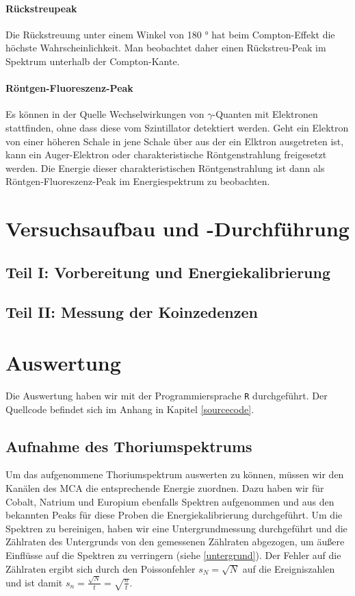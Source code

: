 \documentclass[12pt,listof=totoc]{scrartcl}
\newcommand{\code}[1]{\texttt{#1}}
\begin{document}
 \paragraph{Rückstreupeak}
 
 Die Rückstreuung unter einem Winkel von 180 ° hat beim Compton-Effekt die höchste Wahrscheinlichkeit.
 Man beobachtet daher einen Rückstreu-Peak im Spektrum unterhalb der Compton-Kante.

 
 \paragraph{Röntgen-Fluoreszenz-Peak}
Es können in der Quelle Wechselwirkungen von $\gamma$-Quanten mit Elektronen stattfinden, ohne dass diese vom Szintillator detektiert werden. Geht ein Elektron von einer höheren Schale in jene Schale über aus der ein Elktron ausgetreten ist, kann ein Auger-Elektron oder charakteristische Röntgenstrahlung freigesetzt werden. Die Energie dieser charakteristischen Röntgenstrahlung ist dann als Röntgen-Fluoreszenz-Peak im Energiespektrum zu beobachten.




\newpage
\section{Versuchsaufbau und -Durchführung}

\subsection{Teil I: Vorbereitung und Energiekalibrierung}

\subsection{Teil II: Messung der Koinzedenzen}




\newpage
\section{Auswertung}Die Auswertung haben wir mit der Programmiersprache \code{R} durchgeführt. Der Quellcode befindet sich im Anhang in Kapitel \ref{sourcecode}.
\subsection{Aufnahme des Thoriumspektrums}
Um das aufgenommene Thoriumspektrum auswerten zu können, müssen wir den Kanälen des MCA die entsprechende Energie zuordnen. Dazu haben wir für Cobalt, Natrium und Europium ebenfalls Spektren aufgenommen und aus den bekannten Peaks für diese Proben die Energiekalibrierung durchgeführt. Um die Spektren zu bereinigen, haben wir eine Untergrundmessung durchgeführt und die Zählraten des Untergrunds von den gemessenen Zählraten abgezogen, um äußere Einflüsse auf die Spektren zu verringern (siehe \ref{untergrund}). Der Fehler auf die Zählraten ergibt sich durch den Poissonfehler $s_N=\sqrt{N}$ auf die Ereigniszahlen und ist damit $s_n=\frac{\sqrt{N}}{t}=\sqrt{\frac{n}{t}}$.
\newpage
\end{document}
